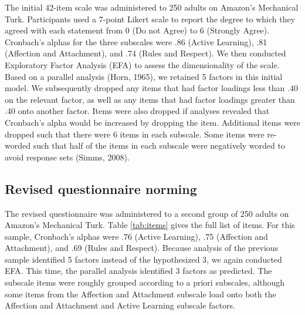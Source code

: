 \documentclass[10pt, letterpaper]{article}
\begin{document}
The initial 42-item scale was administered to 250 adults on Amazon's
Mechanical Turk. Participants used a 7-point Likert scale to report the
degree to which they agreed with each statement from 0 (Do not Agree) to
6 (Strongly Agree). Cronbach's alphas for the three subscales were .86
(Active Learning), .81 (Affection and Attachment), and .74 (Rules and
Respect). We then conducted Exploratory Factor Analysis (EFA) to assess
the dimensionality of the scale. Based on a parallel analysis (Horn,
1965), we retained 5 factors in this initial model. We subsequently
dropped any items that had factor loadings less than .40 on the relevant
factor, as well as any items that had factor loadings greater than .40
onto another factor. Items were also dropped if analyses revealed that
Cronbach's alpha would be increased by dropping the item. Additional
items were dropped such that there were 6 items in each subscale. Some
items were re-worded such that half of the items in each subscale were
negatively worded to avoid response sets (Simms, 2008).

\subsection{Revised questionnaire
norming}\label{revised-questionnaire-norming}

The revised questionnaire was administered to a second group of 250
adults on Amazon's Mechanical Turk. Table \ref{tab:items} gives the full
list of items. For this sample, Cronbach's alphas were .76 (Active
Learning), .75 (Affection and Attachment), and .69 (Rules and Respect).
Because analysis of the previous sample identified 5 factors instead of
the hypothesized 3, we again conducted EFA. This time, the parallel
analysis identified 3 factors as predicted. The subscale items were
roughly grouped according to a priori subscales, although some items
from the Affection and Attachment subscale load onto both the Affection
and Attachment and Active Learning subscale factors.
\end{document}
